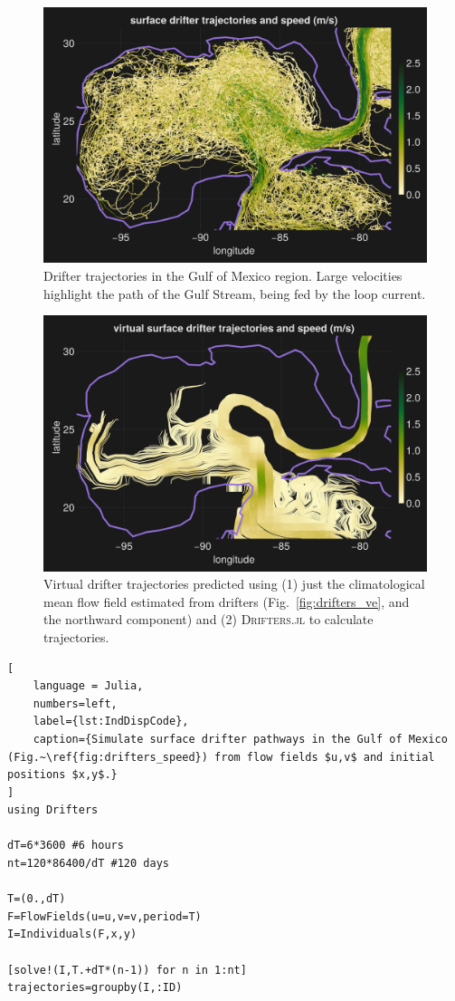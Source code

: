 \documentclass{juliacon}[12pt]
\newcommand{\pkg}[1]{{\small \textsc{#1}}}
\begin{document}
\begin{figure}[t]
\centerline{\includegraphics[width=\columnwidth]{figs/20240528_speed_subset.png}}
\caption{Drifter trajectories in the Gulf of Mexico region. Large velocities highlight the path of the Gulf Stream, being fed by the loop current.}
\label{fig:drifters_speed}
\end{figure}

\begin{figure}[t]
\centerline{\includegraphics[width=\columnwidth]{figs/20240529_speed_subset_IndDisp.png}}
\caption{Virtual drifter trajectories predicted using (1) just the climatological mean flow field estimated from drifters (Fig.~\ref{fig:drifters_ve}, and the northward component) and (2) \pkg{Drifters.jl} to calculate trajectories.}
\label{fig:drifters_speed_simu}
\end{figure}


\begin{lstlisting}[
    language = Julia,
    numbers=left,
    label={lst:IndDispCode},
    caption={Simulate surface drifter pathways in the Gulf of Mexico (Fig.~\ref{fig:drifters_speed}) from flow fields $u,v$ and initial positions $x,y$.}
]
using Drifters

dT=6*3600 #6 hours
nt=120*86400/dT #120 days

T=(0.,dT)
F=FlowFields(u=u,v=v,period=T)
I=Individuals(F,x,y)

[solve!(I,T.+dT*(n-1)) for n in 1:nt]
trajectories=groupby(I,:ID)
\end{lstlisting}
\end{document}
